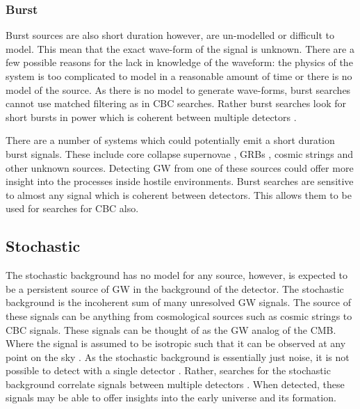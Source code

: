 \subsubsection{\label{sources:transient:burst}Burst}

Burst sources are also short duration however, are un-modelled or difficult to model.
This mean that the exact wave-form of the signal is unknown.
There are a few possible reasons for the lack in knowledge of the waveform: the physics of the system is too complicated to model in a reasonable amount of time or there is no model of the source.
As there is no model to generate wave-forms, burst searches cannot use matched filtering as in \ac{CBC} searches.
Rather burst searches look for short bursts in power which is coherent between multiple detectors \citep{Cornish2015Bayeswave:Glitches,Klimenko2008ABursts}.

There are a number of systems which could potentially emit a short duration burst signals.
These include core collapse supernovae \citep{Ott2008TheSupernovae}, \acp{GRB} \citep{Aasi2014SearchNetwork}, cosmic strings \citep{Damour2005GravitationalWindows} and other unknown sources.
Detecting \ac{GW} from one of these sources could offer more insight into the processes inside hostile environments.
Burst searches are sensitive to almost any signal which is coherent between detectors. 
This allows them to be used for searches for \ac{CBC} also.



\subsection{Stochastic}

The stochastic background has no model for any source, however, is expected to be a persistent source of \ac{GW} in the background of the detector. 
The stochastic background is the incoherent sum of many unresolved \ac{GW} signals.
The source of these signals can be anything from cosmological sources such as cosmic strings to \ac{CBC} signals.
These signals can be thought of as the \ac{GW} analog of the \ac{CMB}.
Where the signal is assumed to be isotropic such that it can be observed at any point on the sky \citep{Christensen2018StochasticBackgrounds}. 
As the stochastic background is essentially just noise, it is not possible to detect with a single detector \citep{Christensen2018StochasticBackgrounds}.
Rather, searches for the stochastic background correlate signals between multiple detectors \citep{Romano2019SearchesBackgrounds,Christensen2018StochasticBackgrounds}. 
When detected, these signals may be able to offer insights into the early universe and its formation.



